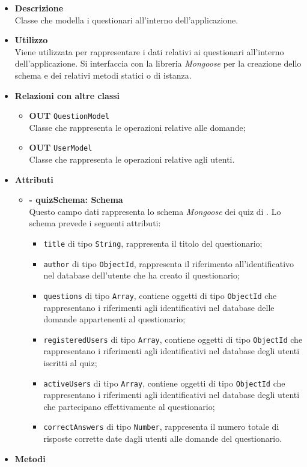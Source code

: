 \begin{itemize}
	\item \textbf{Descrizione} \\
	Classe che modella i questionari all'interno dell'applicazione.
	\item \textbf{Utilizzo} \\
	Viene utilizzata per rappresentare i dati relativi ai questionari all'interno dell'applicazione. Si interfaccia con la libreria \textit{Mongoose} per la creazione dello schema e dei relativi metodi statici o di istanza.
	\item \textbf{Relazioni con altre classi}
		\begin{itemize}
			\item \textbf{OUT} \texttt{QuestionModel}\\
			Classe che rappresenta le operazioni relative alle domande;
			\item \textbf{OUT} \texttt{UserModel}\\
			Classe che rappresenta le operazioni relative agli utenti.
		\end{itemize}
	\item \textbf{Attributi}
		\begin{itemize}
			\item \textbf{- quizSchema: Schema} \\
			Questo campo dati rappresenta lo schema \textit{Mongoose} dei quiz di \progetto. Lo schema prevede i seguenti attributi:
				\begin{itemize}
					\item \texttt{title} di tipo \texttt{String}, rappresenta il titolo del questionario;
					\item \texttt{author} di tipo \texttt{ObjectId}, rappresenta il riferimento all'identificativo nel database dell'utente che ha creato il questionario;
					\item \texttt{questions} di tipo \texttt{Array}, contiene oggetti di tipo \texttt{ObjectId} che rappresentano i riferimenti agli identificativi nel database delle domande appartenenti al questionario;
					\item \texttt{registeredUsers} di tipo \texttt{Array}, contiene oggetti di tipo \texttt{ObjectId} che rappresentano i riferimenti agli identificativi nel database degli utenti iscritti al quiz;
					\item \texttt{activeUsers} di tipo \texttt{Array}, contiene oggetti di tipo \texttt{ObjectId} che rappresentano i riferimenti agli identificativi nel database degli utenti che partecipano effettivamente al questionario;
					\item \texttt{correctAnswers} di tipo \texttt{Number}, rappresenta il numero totale di risposte corrette date dagli utenti alle domande del questionario.	
				\end{itemize}
		\end{itemize}
	\item \textbf{Metodi}
		\begin{itemize}
		

\end{itemize}
\end{itemize}

